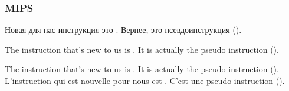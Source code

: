﻿\subsubsection{MIPS}

\ifdefined\RUSSIAN


Новая для нас инструкция это . Вернее, это псевдоинструкция ().
\fi

\ifdefined\ENGLISH


The instruction that's new to us is . It is actually the pseudo instruction ().
\fi

\ifdefined\FRENCH


The instruction that's new to us is . It is actually the pseudo instruction ().
L'instruction qui est nouvelle pour nous est . C'est une pseudo instruction ().
\fi

